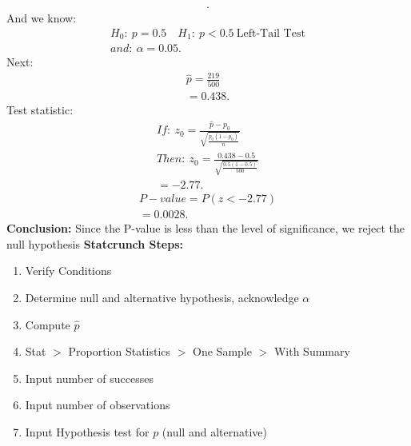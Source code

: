 \documentclass{report}
\begin{document}
\begin{mdframed}
\begin{align*}
        .\end{align*}
        And we know:
        \begin{align*}
            H_{0}:\ p=0.5 \quad H_{1}:\ p< 0.5\ \text{Left-Tail Test} \\
            and:\ \alpha = 0.05
        .\end{align*}
        \bigbreak \noindent 
        Next:
        \begin{align*}
            \hat{p} = \frac{219}{500} \\ 
            = 0.438
        .\end{align*}
        \bigbreak \noindent 
        Test statistic:
        \begin{align*}
            If:\ z_{0} = \frac{\hat{p}-p_{0}}{\sqrt{\frac{p_{0}(1-p_{0})}{n}}} \\
            Then:\ z_{0} = \frac{0.438-0.5}{\sqrt{\frac{0.5(1-0.5)}{500}}} \\ 
            = -2.77
        .\end{align*}
        \bigbreak \noindent 
        \begin{align*}
            P-value = P(z<-2.77) \\
            = 0.0028
        .\end{align*}
        \textbf{Conclusion:} Since the P-value is less than the level of significance, we reject the null hypothesis
        \bigbreak \noindent 
        \textbf{Statcrunch Steps:}
        \begin{enumerate}
            \item Verify Conditions
            \item Determine null and alternative hypothesis, acknowledge $\alpha $
            \item Compute $\hat{p} $
            \item Stat $> $ Proportion Statistics $> $ One Sample $> $ With Summary
            \item Input number of successes
            \item Input number of observations
            \item Input Hypothesis test for $p$ (null and alternative)
        \end{enumerate}
    \end{mdframed}
\end{document}
